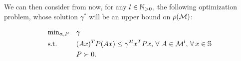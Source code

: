 We can then consider from now, for any $l \in \mathbb{N}_{>0}$, the following optimization problem, whose solution $\gamma^{*}$ will be an upper bound on $\rho(\mathcal{M})$:

\begin{equation}\label{eqn:campiOpt2}
\begin{aligned}
& \text{min}_{\alpha, P} & & \gamma \\
& \text{s.t.} 
&  & (Ax)^TP(Ax) \leq \gamma^{2l} x^TPx,\,\forall\ A \in \mathcal{M}^l, \,\forall\, x \in \mathbb{S}\\
& && P \succ 0. \\
\end{aligned}
\end{equation}